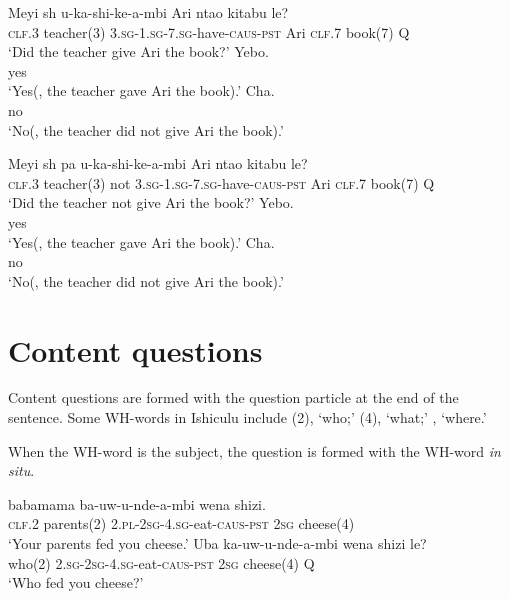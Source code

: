 \begin{exe}
\ex
\begin{xlist}
\ex
\gll Meyi {sh\textramshorns} u-ka-shi-ke-\textbeltl a-mbi Ari nta\textbeltl o kitabu le? \\
\textsc{clf.3} teacher(3) \textsc{3.sg}-\textsc{1.sg}-\textsc{7.sg}-have-\textsc{caus}-\textsc{pst} Ari \textsc{clf.7} book(7) Q \\
\trans `Did the teacher give Ari the book?'
\ex
\gll Yebo. \\
yes \\
\trans `Yes(, the teacher gave Ari the book).'
\ex
\gll Cha. \\
no \\
\trans `No(, the teacher did not give Ari the book).'
\end{xlist}
\ex
\begin{xlist}
\ex
\gll Meyi {sh\textramshorns} pa u-ka-shi-ke-\textbeltl a-mbi Ari nta\textbeltl o kitabu le? \\
\textsc{clf.3} teacher(3) not \textsc{3.sg}-\textsc{1.sg}-\textsc{7.sg}-have-\textsc{caus}-\textsc{pst} Ari \textsc{clf.7} book(7) Q \\
\trans `Did the teacher not give Ari the book?'
\ex
\gll Yebo. \\
yes \\
\trans `Yes(, the teacher gave Ari the book).'
\ex
\gll Cha. \\
no \\
\trans `No(, the teacher did not give Ari the book).'
\end{xlist}
\end{exe}

\section{Content questions}

Content questions are formed with the question particle \textit{} at the end of the sentence. Some WH-words in Ishiculu include \textit{}(2), `who;' \textit{}(4), `what;' \textit{}, `where.'

When the WH-word is the subject, the question is formed with the WH-word \textit{in situ}.

\begin{exe}
\ex
\begin{xlist}
\ex
{} babamama ba-uw-u-nde-\textipa{\textbeltl}a-mbi wena shizi. \\
\textsc{clf.2} parents(2) \textsc{2.pl}-\textsc{2sg}-\textsc{4.sg}-eat-\textsc{caus}-\textsc{pst} \textsc{2sg} cheese(4) \\
\trans `Your parents fed you cheese.'
\ex
\gll Uba ka-uw-u-nde-\textipa{\textbeltl}a-mbi wena shizi le? \\
who(2) \textsc{2.sg}-\textsc{2sg}-\textsc{4.sg}-eat-\textsc{caus}-\textsc{pst} \textsc{2sg} cheese(4) Q \\
\trans `Who fed you cheese?'
\end{xlist}
\end{exe}

